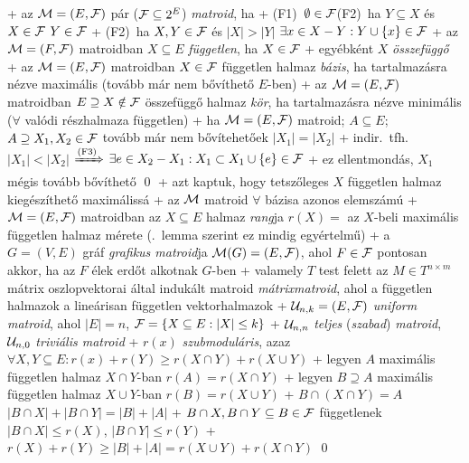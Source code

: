 + \dfn az $\mathcal{M} = (E, \mathcal{F})$ pár ($\mathcal{F} \subseteq 2^E$) \emph{matroid},
  ha
  + (F1)~$\emptyset \in \mathcal{F}$\qquad(F2)~ha $Y \subseteq X$ és $X \in
    \mathcal{F}$ \RA $Y \in \mathcal{F}$
  + (F2)~ha $X, Y \in \mathcal{F}$ és $\lvert X \rvert > \lvert Y \rvert$ \RA
    $\exists x \in X - Y : Y \cup \{ x \} \in \mathcal{F}$
+ \dfn az $\mathcal{M} = (F, \mathcal{F})$ matroidban $X \subseteq E$
  \emph{független}, ha $X \in \mathcal{F}$
  + egyébként $X$ \emph{összefüggő}
+ \dfn az $\mathcal{M} = (E, \mathcal{F})$ matroidban $X \in \mathcal{F}$ független
  halmaz \emph{bázis}, ha tartalmazásra nézve maximális (tovább már
  nem bővíthető $E$-ben)
+ \dfn az $\mathcal{M} = (E, \mathcal{F})$ matroidban $E \supseteq X \notin \mathcal{F}$
  összefüggő halmaz \emph{kör}, ha tartalmazásra nézve minimális
  ($\forall$ valódi részhalmaza független)
+ \lemma \label{lem:matroid:def:meret}ha $\mathcal{M} = (E, \mathcal{F})$ matroid; $A
  \subseteq E$; $A \supseteq X_1, X_2 \in \mathcal{F}$ tovább már nem
  bővítehetőek \RA $\lvert X_1 \rvert = \lvert X_2 \rvert$
  + \proof indir.~tfh.~$\lvert X_1 \rvert < \lvert X_2 \rvert$
    $\xRightarrow{\text{(F3)}}$ $\exists e \in X_2 - X_1 : X_1
    \subset X_1 \cup \{ e \} \in \mathcal{F}$
  + ez ellentmondás, $X_1$ mégis tovább bővíthető \qed
  + azt kaptuk, hogy tetszőleges $X$ független halmaz kiegészíthető
    maximálissá
+ \corr az $\mathcal{M}$ matroid $\forall$ bázisa azonos elemszámú
+ \dfn $\mathcal{M} = (E, \mathcal{F})$ matroidban az $X \subseteq E$ halmaz
  \emph{rang}ja $r(X) =$ az $X$-beli maximális független halmaz mérete
  (.~lemma szerint ez mindig egyértelmű)
+ \example  a $G = (V, E)$ gráf \emph{grafikus matroid}ja $\mathcal{M}(G) =
  (E, \mathcal{F})$, ahol $F \in \mathcal{F}$ pontosan akkor, ha az $F$ élek erdőt
  alkotnak $G$-ben
+ \example valamely $T$ test felett az $M \in T^{n \times m}$ mátrix
  oszlopvektorai által indukált matroid \emph{mátrixmatroid}, ahol
  a független halmazok a lineárisan független vektorhalmazok
+ $\mathcal{U}_{n, k} = (E, \mathcal{F})$ \emph{uniform matroid}, ahol $\lvert E
  \rvert = n$, $\mathcal{F} = \{ X \subseteq E : \lvert X \rvert \le k \}$
  + $\mathcal{U}_{n, n}$ \emph{teljes} (\emph{szabad}) \emph{matroid},
    $\mathcal{U}_{n, 0}$ \emph{triviális matroid}
+ \thm $r(x)$ \emph{szubmoduláris}, azaz $\forall X, Y \subseteq E:
  r(x) + r(Y) \ge r(X \cap Y) + r(X \cup Y)$
  + \proof legyen $A$ maximális független halmaz $X \cap Y$-ban
    \RA $r(A) = r(X \cap Y)$
  + legyen $B \supseteq A$ maximális független halmaz $X \cup Y$-ban
    \RA $r(B) = r(X \cup Y)$
  + $B \cap (X \cap Y) = A$ \RA $\lvert B \cap X \rvert + \lvert B
    \cap Y \rvert = \lvert B \rvert + \lvert A \rvert$
  + $B \cap X, B \cap Y \subseteq B \in \mathcal{F}$ függetlenek \RA%
    $\lvert B \cap X \rvert \le r(X)$, $\lvert B \cap Y \rvert \le
    r(Y)$
  + $r(X) + r(Y) \ge \lvert B \rvert + \lvert A \rvert = r(X \cup Y) +
    r(X \cap Y)$ \qed

